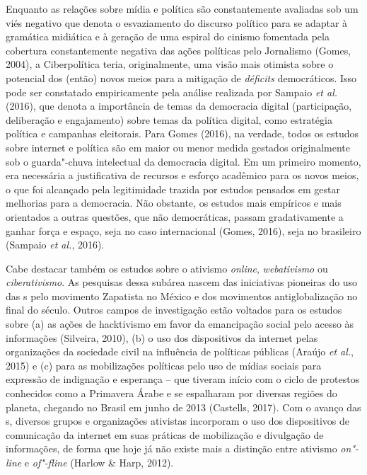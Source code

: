 Enquanto as relações sobre mídia e política são constantemente avaliadas
sob um viés negativo que denota o esvaziamento do discurso político para
se adaptar à gramática midiática e à geração de uma espiral do cinismo
fomentada pela cobertura constantemente negativa das ações políticas
pelo Jornalismo (Gomes, 2004), a Ciberpolítica teria, originalmente, uma
visão mais otimista sobre o potencial dos (então) novos meios para a
mitigação de \emph{déficits} democráticos. Isso pode ser constatado
empiricamente pela análise realizada por Sampaio \emph{et al.} (2016),
que denota a importância de temas da democracia digital (participação,
deliberação e engajamento) sobre temas da política digital, como
estratégia política e campanhas eleitorais. Para Gomes (2016), na
verdade, todos os estudos sobre internet e política são em maior ou
menor medida gestados originalmente sob o guarda"-chuva intelectual da
democracia digital. Em um primeiro momento, era necessária a
justificativa de recursos e esforço acadêmico para os novos meios, o que
foi alcançado pela legitimidade trazida por estudos pensados em gestar
melhorias para a democracia. Não obstante, os estudos mais empíricos e
mais orientados a outras questões, que não democráticas, passam
gradativamente a ganhar força e espaço, seja no caso internacional
(Gomes, 2016), seja no brasileiro (Sampaio \emph{et al.}, 2016).

Cabe destacar também os estudos sobre o ativismo \emph{online},
\emph{webativismo} ou \emph{ciberativismo}. As pesquisas dessa subárea
nascem das iniciativas pioneiras do uso das s pelo movimento
Zapatista no México e dos movimentos antiglobalização no final do
século. Outros campos de investigação estão voltados para os estudos
sobre (a) as ações de hacktivismo em favor da emancipação social pelo
acesso às informações (Silveira, 2010), (b) o uso dos dispositivos da
internet pelas organizações da sociedade civil na influência de
políticas públicas (Araújo \emph{et al.}, 2015) e (c) para as
mobilizações políticas pelo uso de mídias sociais para expressão de
indignação e esperança -- que tiveram início com o ciclo de protestos
conhecidos como a Primavera Árabe e se espalharam por diversas regiões
do planeta, chegando no Brasil em junho de 2013 (Castells, 2017). Com o
avanço das s, diversos grupos e organizações ativistas incorporam o
uso dos dispositivos de comunicação da internet em suas práticas de
mobilização e divulgação de informações, de forma que hoje já não existe
mais a distinção entre ativismo \emph{on"-line} e \emph{of"-fline} (Harlow
\& Harp, 2012).

